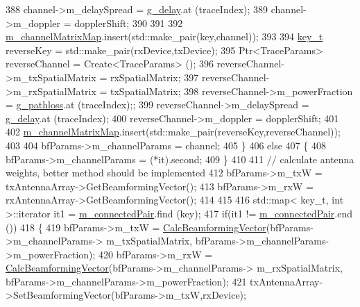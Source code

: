 \begin{DoxyCode}
388                 channel->m\_delaySpread = \hyperlink{namespacens3_a9ae8878579236b1567aca15ee5d820b7}{g\_delay}.at (traceIndex);
389                 channel->m\_doppler = dopplerShift;
390 
391 
392                 \hyperlink{classns3_1_1MmWaveChannelRaytracing_abdee4d8795a80d738563c52ec233cfdd}{m\_channelMatrixMap}.insert(std::make\_pair(key,channel));
393 
394                 \hyperlink{namespacens3_aa42bd408e172586b3b192acfaa36b070}{key\_t} reverseKey = std::make\_pair(rxDevice,txDevice);
395                 Ptr<TraceParams> reverseChannel = Create<TraceParams> ();
396                 reverseChannel->m\_txSpatialMatrix = rxSpatialMatrix;
397                 reverseChannel->m\_rxSpatialMatrix = txSpatialMatrix;
398                 reverseChannel->m\_powerFraction = \hyperlink{namespacens3_a7393b978973ee32cbf20a99c193f3aa7}{g\_pathloss}.at (traceIndex);;
399                 reverseChannel->m\_delaySpread = \hyperlink{namespacens3_a9ae8878579236b1567aca15ee5d820b7}{g\_delay}.at (traceIndex);
400                 reverseChannel->m\_doppler = dopplerShift;
401 
402                 \hyperlink{classns3_1_1MmWaveChannelRaytracing_abdee4d8795a80d738563c52ec233cfdd}{m\_channelMatrixMap}.insert(std::make\_pair(reverseKey,reverseChannel));
403 
404                 bfParams->m\_channelParams = channel;
405         \}
406         \textcolor{keywordflow}{else}
407         \{
408                 bfParams->m\_channelParams = (*it).second;
409         \}
410 
411         \textcolor{comment}{//      calculate antenna weights, better method should be implemented}
412         bfParams->m\_txW = txAntennaArray->GetBeamformingVector();
413         bfParams->m\_rxW = rxAntennaArray->GetBeamformingVector();
414 
415 
416         std::map< key\_t, int >::iterator it1 = \hyperlink{classns3_1_1MmWaveChannelRaytracing_a51c4346d4884ef3b8b08667ab6ca790d}{m\_connectedPair}.find (key);
417         \textcolor{keywordflow}{if}(it1 != \hyperlink{classns3_1_1MmWaveChannelRaytracing_a51c4346d4884ef3b8b08667ab6ca790d}{m\_connectedPair}.end ())
418         \{
419                 bfParams->m\_txW = \hyperlink{classns3_1_1MmWaveChannelRaytracing_a523c2da49105b8b3365e5a60e225b0ca}{CalcBeamformingVector}(bfParams->m\_channelParams->
      m\_txSpatialMatrix, bfParams->m\_channelParams->m\_powerFraction);
420                 bfParams->m\_rxW = \hyperlink{classns3_1_1MmWaveChannelRaytracing_a523c2da49105b8b3365e5a60e225b0ca}{CalcBeamformingVector}(bfParams->m\_channelParams->
      m\_rxSpatialMatrix, bfParams->m\_channelParams->m\_powerFraction);
421                 txAntennaArray->SetBeamformingVector(bfParams->m\_txW,rxDevice);

\end{DoxyCode}
